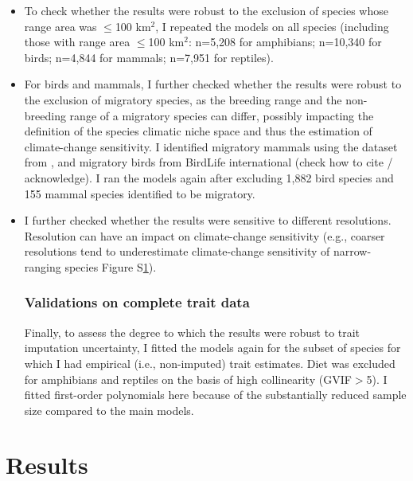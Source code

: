 \begin{itemize}

\item To check whether the results were robust to the exclusion of species whose range area was $\leq$100 km$^2$, I repeated the models on all species (including those with range area $\leq$100 km$^2$: n=5,208 for amphibians; n=10,340 for birds; n=4,844 for mammals; n=7,951 for reptiles). 

\item For birds and mammals, I further checked whether the results were robust to the exclusion of migratory species, as the breeding range and the non-breeding range of a migratory species can differ, possibly impacting the definition of the species climatic niche space and thus the estimation of climate-change sensitivity. I identified migratory mammals using the dataset from \citet{Gnanadesikan2017}, and migratory birds from BirdLife international (check how to cite / acknowledge). I ran the models again after excluding 1,882 bird species and 155 mammal species identified to be migratory.

\item I further checked whether the results were sensitive to different resolutions. Resolution can have an impact on climate-change sensitivity (e.g., coarser resolutions tend to underestimate climate-change sensitivity of narrow-ranging species Figure S\ref{}). 

\subsubsection{Validations on complete trait data}
Finally, to assess the degree to which the results were robust to trait imputation uncertainty, I fitted the models again for the subset of species for which I had empirical (i.e., non-imputed) trait estimates. Diet was excluded for amphibians and reptiles on the basis of high collinearity (GVIF$>$5). I fitted first-order polynomials here because of the substantially reduced sample size compared to the main models.

\end{itemize}




\section{Results}


